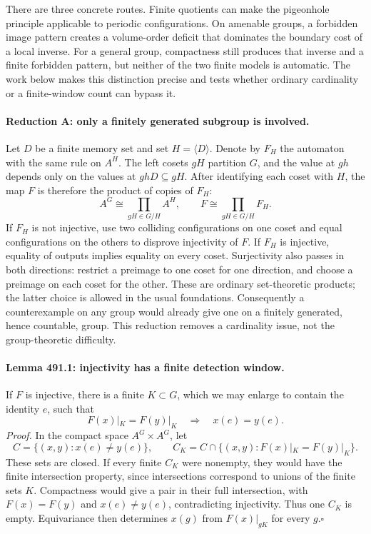 \documentclass[11pt]{article}
\begin{document}
There are three concrete routes. Finite quotients can make the pigeonhole
principle applicable to periodic configurations. On amenable groups, a
forbidden image pattern creates a volume-order deficit that dominates the
boundary cost of a local inverse. For a general group, compactness still
produces that inverse and a finite forbidden pattern, but neither of the two
finite models is automatic. The work below makes this distinction precise
and tests whether ordinary cardinality or a finite-window count can bypass it.

\paragraph{Reduction A: only a finitely generated subgroup is involved.}
Let $D$ be a finite memory set and set $H=\langle D\rangle$. Denote by $F_H$
the automaton with the same rule on $A^H$. The left cosets $gH$ partition $G$,
and the value at $gh$ depends only on the values at $ghD\subseteq gH$.
After identifying each coset with $H$, the map $F$ is therefore the product
of copies of $F_H$:
\begin{equation}\label{a491:cosets}
 A^G\cong\prod_{gH\in G/H}A^H,
 \qquad F\cong\prod_{gH\in G/H}F_H.
\end{equation}
If $F_H$ is not injective, use two colliding configurations on one coset
and equal configurations on the others to disprove injectivity of $F$.
If $F_H$ is injective, equality of outputs implies equality on every coset.
Surjectivity also passes in both directions: restrict a preimage to one
coset for one direction, and choose a preimage on each coset for the other.
These are ordinary set-theoretic products; the latter choice is allowed
in the usual foundations. Consequently a counterexample on any group would
already give one on a finitely generated, hence countable, group.
This reduction removes a cardinality issue, not the group-theoretic difficulty.

\paragraph{Lemma 491.1: injectivity has a finite detection window.}
If $F$ is injective, there is a finite $K\subset G$, which we may enlarge
to contain the identity $e$, such that
\begin{equation}\label{a491:detection}
 F(x)|_K=F(y)|_K\quad\Longrightarrow\quad x(e)=y(e).
\end{equation}
\emph{Proof.} In the compact space $A^G\times A^G$, let
\[
 C=\{(x,y):x(e)\ne y(e)\},\qquad
 C_K=C\cap\{(x,y):F(x)|_K=F(y)|_K\}.
\]
These sets are closed. If every finite $C_K$ were nonempty, they would
have the finite intersection property, since intersections correspond to
unions of the finite sets $K$. Compactness would give a pair in their full
intersection, with $F(x)=F(y)$ and $x(e)\ne y(e)$, contradicting injectivity.
Thus one $C_K$ is empty. Equivariance then determines $x(g)$ from
$F(x)|_{gK}$ for every $g$.\hfill$\square$
\end{document}
